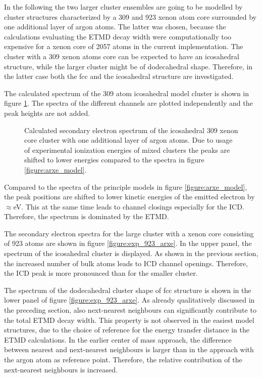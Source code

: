 In the following the two larger cluster ensembles are going to be modelled
by cluster structures characterized by a 309 and 923 xenon atom core surrounded
by one additional layer of argon atoms. The latter was chosen, because the
calculations evaluating the ETMD decay width were computationally
too expensive for a xenon core of 2057 atoms in the current implementation.
The cluster with a 309 xenon atoms core can be expected to have an icosahedral
structure, while the larger cluster might be of dodecahedral shape. Therefore,
in the latter case both the fcc and the icosahedral structure are investigated.

The calculated spectrum of the 309 atom icosahedral model cluster is
shown in figure \ref{figure:exp_309ico_arxe}. The spectra of the different
channels are plotted independently and the peak heights are not added.

\begin{figure}[t]
 \centering
 
 \caption{Calculated secondary electron spectrum of the icosahedral
          309 xenon core cluster with one additional layer of argon
          atoms. Due to usage of experimental ionization energies of
          mixed clusters the peaks are shifted to lower energies compared
          to the spectra in figure \ref{figure:arxe_model}.}
 \label{figure:exp_309ico_arxe}
\end{figure}

Compared to the spectra of the principle models in figure \ref{figure:arxe_model},
the peak positions are shifted to lower kinetic energies of the emitted
electron by $\approx$\unit[1]{eV}. This at the same time leads to
channel closings especially for
the \ac{ICD}. Therefore, the spectrum is dominated by the \ac{ETMD}.


The secondary electron spectra for the large cluster with a xenon
core consisting of 923 atoms are shown in figure \ref{figure:exp_923_arxe}.
In the upper panel, the spectrum of the icosahedral cluster is displayed.
As shown in the previous section, the increased number of bulk atoms
leads to ICD channel openings. Therefore, the ICD peak is more pronounced
than for the smaller cluster.

The spectrum of the dodecahedral cluster shape of fcc structure is shown in
the lower panel of figure \ref{figure:exp_923_arxe}. As already qualitatively
discussed in the preceding section, also next-nearest neighbours can
significantly contribute to the total ETMD decay width. This property is
not observed in the easiest model structures, due to the choice of 
reference for the energy transfer distance in the ETMD calculations.
In the earlier center of mass approach, the difference between nearest
and next-nearest neighbours is larger than in the approach with the argon
atom as reference point. Therefore, the relative contribution of the
next-nearest neighbours is increased.

